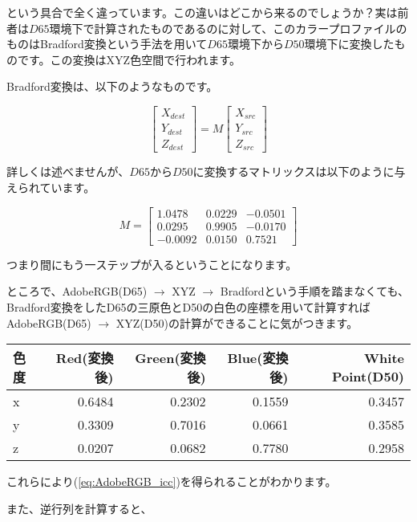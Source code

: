 \documentclass[12pt]{jsarticle}
\begin{document}
という具合で全く違っています。この違いはどこから来るのでしょうか？実は前者は$D65$環境下で計算されたものであるのに対して、このカラープロファイルのものはBradford変換という手法を用いて$D65$環境下から$D50$環境下に変換したものです。この変換はXYZ色空間で行われます。

Bradford変換は、以下のようなものです。

\[
\begin{bmatrix}
X_{dest} \\
Y_{dest} \\
Z_{dest}
\end{bmatrix}
=
M
\begin{bmatrix}
X_{src} \\
Y_{src} \\
Z_{src}
\end{bmatrix}
\]

詳しくは述べませんが、$D65$から$D50$に変換するマトリックスは以下のように与えられています。

\[
M =
\begin{bmatrix}
 1.0478 & 0.0229 & -0.0501 \\
 0.0295 & 0.9905 & -0.0170 \\
-0.0092 & 0.0150 & 0.7521
\end{bmatrix}
\]

つまり間にもう一ステップが入るということになります。

ところで、AdobeRGB(D65) $\rightarrow$ XYZ $\rightarrow$ Bradfordという手順を踏まなくても、Bradford変換をしたD65の三原色とD50の白色の座標を用いて計算すれば AdobeRGB(D65) $\rightarrow$ XYZ(D50)の計算ができることに気がつきます。

\begin{center}
\begin{tabular}{|l|r|r|r|r|} \hline
色度 & Red(変換後) & Green(変換後) & Blue(変換後) & White Point(D50) \\ \hline
x & 0.6484 & 0.2302 & 0.1559 & 0.3457 \\ \hline
y & 0.3309 & 0.7016 & 0.0661 & 0.3585 \\ \hline
z & 0.0207 & 0.0682 & 0.7780 & 0.2958 \\ \hline
\end{tabular}
\end{center}

これらにより(\ref{eq:AdobeRGB_icc})を得られることがわかります。

また、逆行列を計算すると、
\end{document}

